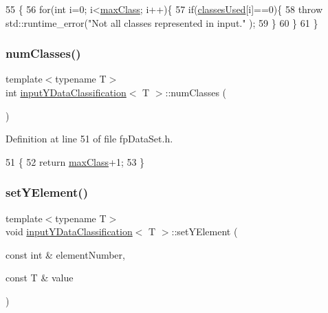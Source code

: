 \begin{DoxyCode}
55                                        \{
56             \textcolor{keywordflow}{for}(\textcolor{keywordtype}{int} i=0; i<\hyperlink{classinputYDataClassification_a869375cfd78524833cd69aca9daf8aec}{maxClass}; i++)\{
57                 \textcolor{keywordflow}{if}(\hyperlink{classinputYDataClassification_aa757e6d11b67d82357b863132155f933}{classesUsed}[i]==0)\{
58                 \textcolor{keywordflow}{throw} std::runtime\_error(\textcolor{stringliteral}{"Not all classes represented in input."} );
59                     \}
60             \}
61         \}
\end{DoxyCode}
\mbox{\label{classinputYDataClassification_ae090531ab57b174ab007a2a8248462fe}} 
\subsubsection{\texorpdfstring{num\+Classes()}{numClasses()}}
{\footnotesize\ttfamily template$<$typename T$>$ \\
int \hyperlink{classinputYDataClassification}{input\+Y\+Data\+Classification}$<$ T $>$\+::num\+Classes (\begin{DoxyParamCaption}{ }\end{DoxyParamCaption})\hspace{0.3cm}{\ttfamily [inline]}}



Definition at line 51 of file fp\+Data\+Set.\+h.


\begin{DoxyCode}
51                                \{
52             \textcolor{keywordflow}{return} \hyperlink{classinputYDataClassification_a869375cfd78524833cd69aca9daf8aec}{maxClass}+1;
53         \}
\end{DoxyCode}
\mbox{\label{classinputYDataClassification_ae6f3f163739a75bb379dd80d7c9649a2}} 
\subsubsection{\texorpdfstring{set\+Y\+Element()}{setYElement()}}
{\footnotesize\ttfamily template$<$typename T$>$ \\
void \hyperlink{classinputYDataClassification}{input\+Y\+Data\+Classification}$<$ T $>$\+::set\+Y\+Element (\begin{DoxyParamCaption}\item[{const int \&}]{element\+Number,  }\item[{const T \&}]{value }\end{DoxyParamCaption})\hspace{0.3cm}{\ttfamily [inline]}}




